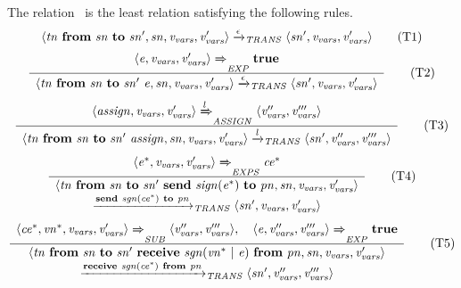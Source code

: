\noindent
The relation~\TransitionsRelation{} is the least relation satisfying the following rules.
%
\begin{equation*}
\langle \it{tn}~\textbf{from}~\it{sn}~\textbf{to}~\it{sn'}, \it{sn}, v_{\it{vars}}, v_{\it{vars}}' \rangle
\xrightarrow{\it{\epsilon}}_{\it{TRANS}}
\langle \it{sn'}, v_{\it{vars}}, v_{\it{vars}}' \rangle
\tag{T1}
\label{eq:sos-slco:trans-empty}
\end{equation*}
%
\begin{equation*}
 \frac{ \begin{array}[c]{c} 
\langle \it{e}, v_{\it{vars}}, v_{\it{vars}}' \rangle
\xRightarrow{\it{}}_{\it{EXP}}
\textbf{true}
 \end{array} }{ \begin{array}[c]{c} 
\langle \it{tn}~\textbf{from}~\it{sn}~\textbf{to}~\it{sn'}~\it{e}, \it{sn}, v_{\it{vars}}, v_{\it{vars}}' \rangle
\xrightarrow{\it{\epsilon}}_{\it{TRANS}}
\langle \it{sn'}, v_{\it{vars}}, v_{\it{vars}}' \rangle
 \end{array} } 
\tag{T2}
\label{eq:sos-slco:trans-expression}
\end{equation*}
%
\begin{equation*}
 \frac{ \begin{array}[c]{c} 
\langle \it{assign}, v_{\it{vars}}, v_{\it{vars}}' \rangle
\xRightarrow{\it{l}}_{\it{ASSIGN}}
\langle v_{\it{vars}}'', v_{\it{vars}}''' \rangle
 \end{array} }{ \begin{array}[c]{c} 
\langle \it{tn}~\textbf{from}~\it{sn}~\textbf{to}~\it{sn'}~\it{assign}, \it{sn}, v_{\it{vars}}, v_{\it{vars}}' \rangle
\xrightarrow{\it{\it{l}}}_{\it{TRANS}}
\langle \it{sn'}, v_{\it{vars}}'', v_{\it{vars}}''' \rangle
 \end{array} } 
\tag{T3}
\label{eq:sos-slco:trans-assignment}
\end{equation*}
%
\begin{equation*}
 \frac{ \begin{array}[c]{c} 
\langle \it{e^*}, v_{\it{vars}}, v_{\it{vars}}' \rangle
\xRightarrow{\it{}}_{\it{EXPS}}
\it{ce^*}
 \end{array} }{ \begin{array}[c]{c} 
\langle \it{tn}~\textbf{from}~\it{sn}~\textbf{to}~\it{sn'}~\textbf{send}~\it{sign}(\it{e^*})~\textbf{to}~\it{pn}, \it{sn}, v_{\it{vars}}, v_{\it{vars}}' \rangle \\
\xrightarrow{\it{\textbf{send}~\it{sgn}(\it{ce^*})~\textbf{to}~\it{pn}}}_{\it{TRANS}}
\langle \it{sn'}, v_{\it{vars}}, v_{\it{vars}}' \rangle
 \end{array} } 
\tag{T4}
\label{eq:sos-slco:trans-send}
\end{equation*}
%
\begin{equation*}
 \frac{ \begin{array}[c]{c} 
\langle \it{ce^*}, \it{vn^*}, v_{\it{vars}}, v_{\it{vars}}' \rangle
\xRightarrow{\it{}}_{\it{SUB}}
\langle v_{\it{vars}}'', v_{\it{vars}}''' \rangle, \quad
\langle \it{e}, v_{\it{vars}}'', v_{\it{vars}}''' \rangle
\xRightarrow{\it{}}_{\it{EXP}}
\textbf{true}
 \end{array} }{ \begin{array}[c]{c} 
\langle \it{tn}~\textbf{from}~\it{sn}~\textbf{to}~\it{sn'}~\textbf{receive}~\it{sgn}(\it{vn^*}~|~\it{e})~\textbf{from}~\it{pn}, \it{sn}, v_{\it{vars}}, v_{\it{vars}}' \rangle \\
\xrightarrow{\it{\textbf{receive}~\it{sgn}(\it{ce^*})~\textbf{from}~\it{pn}}}_{\it{TRANS}}
\langle \it{sn'}, v_{\it{vars}}'', v_{\it{vars}}''' \rangle
 \end{array} } 
\tag{T5}
\label{eq:sos-slco:trans-reception}
\end{equation*}

